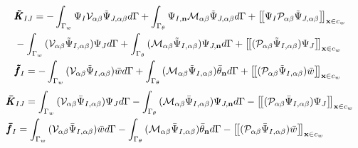 \documentclass[11pt,a4paper]{article}
\begin{document}
\begin{equation}
    \begin{split}
   &{{\pmb{\tilde K}}_{IJ}} =  - \int_{{\Gamma _w}}^{} {{\Psi _I}{{\cal V}_{\alpha \beta }}{{\tilde \Psi }_{J,\alpha \beta }}d\Gamma }  + \int_{{\Gamma _\theta }}^{} {{\Psi _{I,{\bf{n}}}}{{\cal M}_{\alpha \beta }}{{\tilde \Psi }_{J,\alpha \beta }}d\Gamma  + {{\left[\kern-0.15em\left[ {{\Psi _I}{{\cal P}_{\alpha \beta }}{{\tilde \Psi }_{J,\alpha \beta }}} 
     \right]\kern-0.15em\right]}_{{\bf{x}} \in {c_w}}}} \\
     &- \int_{{\Gamma _w}}^{} {({{\cal V}_{\alpha \beta }}{{\tilde \Psi }_{I,\alpha \beta }}){\Psi _J}d\Gamma }  + \int_{{\Gamma _\theta }}^{} {({{\cal M}_{\alpha \beta }}{{\tilde \Psi }_{I,\alpha \beta }}){\Psi _{J,{\bf{n}}}}d\Gamma }  + {\left[\kern-0.15em\left[ {({{\cal P}_{\alpha \beta }}{{\tilde \Psi }_{I,\alpha \beta }}){\Psi _J}} 
     \right]\kern-0.15em\right]_{{\bf{x}} \in {c_w}}}\\
    &{{{\pmb{\tilde f}_I}} = - \int_{{\Gamma _w}}^{} {({{\cal V}_{\alpha \beta }}{{\tilde \Psi }_{I,\alpha \beta }})\bar wd\Gamma }  + \int_{{\Gamma _\theta }}^{} {({{\cal M}_{\alpha \beta }}{{\tilde \Psi }_{I,\alpha \beta }}){{\bar \theta }_{\bf{n}}}d\Gamma }  + {{\left[\kern-0.15em\left[ {({{\cal P}_{\alpha \beta }}{{\tilde \Psi }_{I,\alpha \beta }})\bar w} 
     \right]\kern-0.15em\right]}_{{\bf{x}} \in {c_w}}}}
    \end{split}
    \end{equation}
\begin{equation}
\begin{split}
        &{{{\pmb{\bar K}_{IJ}}} = \int_{{\Gamma _w}}^{} {({{\cal V}_{\alpha \beta }}{{\bar \Psi }_{I,\alpha \beta }}){\Psi _J}d\Gamma }  - \int_{{\Gamma _\theta }}^{} {({{\cal M}_{\alpha \beta }}{{\bar \Psi }_{I,\alpha \beta }}){\Psi _{J,{\bf{n}}}}d\Gamma }  - {{\left[\kern-0.15em\left[ {({{\cal P}_{\alpha \beta }}{{\bar \Psi }_{I,\alpha \beta }}){\Psi _J}} 
         \right]\kern-0.15em\right]}_{{\bf{x}} \in {c_w}}}}\\
        &{{{\pmb{\bar f}_I}} = \int_{{\Gamma _w}}^{} {({{\cal V}_{\alpha \beta }}{{\bar \Psi }_{I,\alpha \beta }})\bar wd\Gamma }  - \int_{{\Gamma _\theta }}^{} {({{\cal M}_{\alpha \beta }}{{\bar \Psi }_{I,\alpha \beta }}){{\bar \theta }_{\bf{n}}}d\Gamma }  - {{\left[\kern-0.15em\left[ {({{\cal P}_{\alpha \beta }}{{\bar \Psi }_{I,\alpha \beta }})\bar w} 
         \right]\kern-0.15em\right]}_{{\bf{x}} \in {c_w}}}}
\end{split}
\end{equation}
\end{document}
